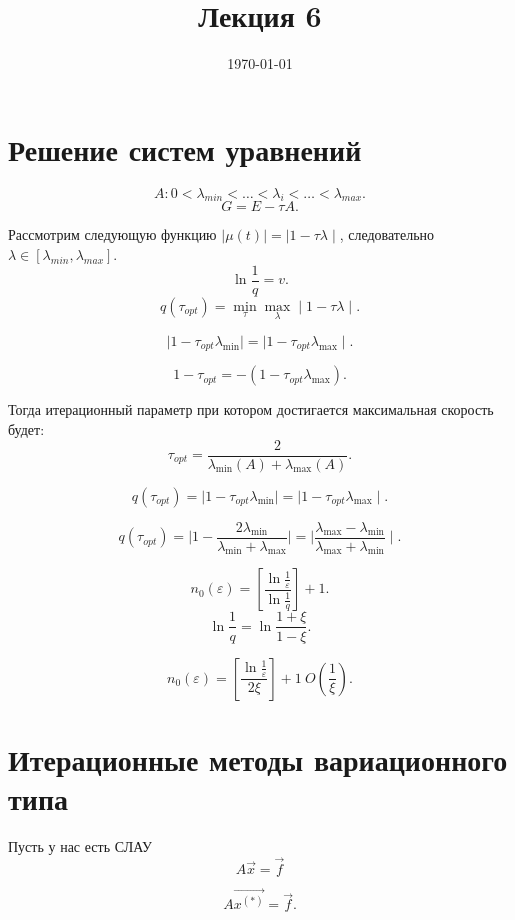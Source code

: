 \documentclass[a4paper,12pt]{article}
\title{Лекция 6}
\date{\today}
\begin{document}
\maketitle

\section{Решение систем уравнений}%
\label{sec:решение_систем_уравнений}

\[
    A: 0 < \lambda_{min} < \ldots < \lambda_{i} < \ldots < \lambda_{max}
.\] 
\[
G = E - \tau A
.\] 

Рассмотрим следующую функцию $ \mid \mu (t)  \mid =  \mid 1 - \tau \lambda  \mid $,
следовательно $\lambda \in [\lambda_{min}, \lambda_{max}]$.
\[
\ln \frac{1}{q} = v
.\] 
\[
    q(\tau_{opt}) = \min_{\tau} \max_{\lambda}  \mid 1 - \tau \lambda  \mid 
.\] 

\[
 \mid 1 - \tau_{opt} \lambda_{\min}  \mid =  \mid 1 - \tau_{opt} \lambda_{\max}  \mid 
.\] 

\[
    1 - \tau_{opt} = - (1 - \tau_{opt} \lambda_{\max})
.\] 

Тогда итерационный параметр при котором достигается максимальная скорость будет:
\[
    \tau_{opt} = \frac{2}{\lambda_{\min}(A) + \lambda_{\max}(A)}
.\] 

\[
    q(\tau_{opt}) =  \mid 1 - \tau_{opt}\lambda_{\min} \mid =  \mid 1 - \tau_{opt}\lambda_{\max} \mid   
.\] 

\[
    q(\tau_{opt}) =  \mid 1 - \frac{2 \lambda_{\min}}{\lambda_{\min} + \lambda_{\max}} \mid = 
     \mid \frac{\lambda_{\max} - \lambda_{\min}}{\lambda_{\max} + \lambda_{\min}} \mid 
.\] 

\[
    n_0(\varepsilon) = [\frac{\ln \frac{1}{\varepsilon}}{\ln \frac{1}{q}}] + 1
.\] 
\[
\ln \frac{1}{q} = \ln \frac{1 + \xi}{1 - \xi}
.\] 

\[
    n_0 ( \varepsilon ) = [\frac{\ln \frac{1}{ \varepsilon }}{2 \xi }] + 1 ~ O(\frac{1}{ \xi  })
.\] 

\section{Итерационные методы вариационного типа}%
\label{sec:итерационные_методы_вариационного_типа}

Пусть у нас есть СЛАУ 
\begin{equation}
    A \vec{x} = \vec{f}
\end{equation}

\[
    A \vec{x^{(*)}} = \vec{f}
.\] 
\end{document}
